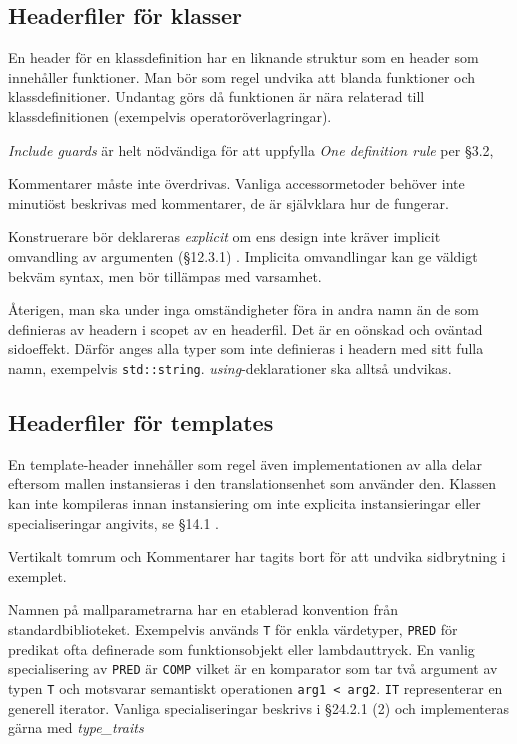 \documentclass[a4paper,portrait]{miunart} %
\begin{document}
\pagebreak
\subsection{Headerfiler för klasser}
\label{sec:class.headers}
En header för en klassdefinition har en liknande struktur som en header som 
innehåller funktioner.  Man bör som regel undvika att blanda funktioner och 
klassdefinitioner. Undantag görs då funktionen är nära relaterad till 
klassdefinitionen (exempelvis operatoröverlagringar). 



\emph{Include guards} är helt nödvändiga för att uppfylla
\emph{One definition rule} per §3.2, \cite{ISO:n3337}


Kommentarer måste inte överdrivas. Vanliga accessormetoder behöver inte 
minutiöst beskrivas med kommentarer, de är självklara hur de fungerar. 

Konstruerare bör deklareras \emph{explicit} om ens design inte kräver implicit 
omvandling av argumenten (§12.3.1) \cite{ISO:n3337}. Implicita omvandlingar kan 
ge väldigt bekväm syntax, men bör tillämpas med varsamhet.

Återigen, man ska under inga omständigheter föra in andra namn än de som 
definieras av headern i scopet av en headerfil. Det är en oönskad och oväntad 
sidoeffekt.  Därför anges alla typer som inte definieras i headern med sitt 
fulla namn, exempelvis \texttt{std::string}. \emph{using}-deklarationer ska 
alltså undvikas.

\pagebreak
\subsection{Headerfiler för templates}
\label{sec:class.template.headers}

En template-header innehåller som regel även implementationen av alla delar 
eftersom mallen instansieras i den translationsenhet som använder den.  Klassen 
kan inte kompileras innan instansiering om inte explicita instansieringar eller 
specialiseringar angivits, se §14.1 \cite{ISO:n3337}.



Vertikalt tomrum och Kommentarer har tagits bort för att undvika sidbrytning 
i exemplet.

Namnen på mallparametrarna har en etablerad konvention från 
standardbiblioteket. Exempelvis används \texttt{T} för enkla värdetyper, 
\texttt{PRED} för predikat ofta definerade som funktionsobjekt eller 
lambdauttryck. En vanlig specialisering av \texttt{PRED} är \texttt{COMP} 
vilket är en komparator som tar två argument av typen \texttt{T} och motsvarar 
semantiskt operationen \texttt{arg1 < arg2}. \texttt{IT} representerar en 
generell iterator. Vanliga specialiseringar beskrivs i §24.2.1 (2) 
\cite{ISO:n3337} och implementeras gärna med \emph{type\_traits}
\end{document}

